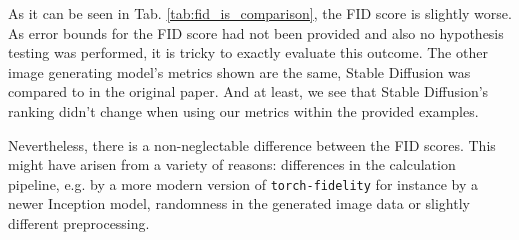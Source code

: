 \documentclass[11pt]{article}
\begin{document}
As it can be seen in Tab. \ref{tab:fid_is_comparison}, the FID score is slightly worse. As error bounds for the FID score had not been provided and also no hypothesis testing was performed, it is tricky to exactly evaluate this outcome. The other image generating model's metrics shown are the same, Stable Diffusion was compared to in the original paper. And at least, we see that Stable Diffusion's ranking didn't change when using our metrics within the provided examples.

Nevertheless, there is a non-neglectable difference between the FID scores. This might have arisen from a variety of reasons: differences in the calculation pipeline, e.g. by a more modern version of \texttt{torch-fidelity} for instance by a newer Inception model, randomness in the generated image data or slightly different preprocessing. 
\end{document}
